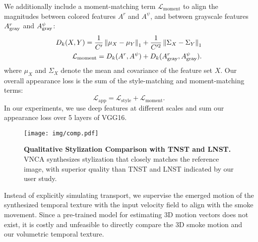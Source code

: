 We additionally include a moment-matching term $\mathcal{L}_\text{moment}$ to align the magnitudes between colored features $A^r$ and $A^\psi$, and between grayscale features $A_{\textup{gray}}^r$ and $A_{\textup{gray}}^\psi$:
\begin{equation}
    \begin{aligned}
        D_k(X, Y) = \frac{1}{C'} \left\lVert\mu_{X} - \mu_{Y}\right\rVert_1 +  \frac{1}{C'^2} \left\lVert\Sigma_{X} - \Sigma_{Y}\right\rVert_1 \\
        \mathcal{L}_\text{moment} = D_k(A^r, A^\psi) + D_k({A}_{\textup{gray}}^r, {A}_{\textup{gray}}^\psi). 
    \end{aligned}
\end{equation}
where $\mu_{X}$ and $\Sigma_{X}$ denote the mean and covariance of the feature set $X$. 
Our overall appearance loss is the sum of the style-matching and moment-matching terms:
\begin{equation}
     \mathcal{L}_\text{app} = \mathcal{L}_\text{style} + \mathcal{L}_\text{moment}.
\end{equation}
In our experiments, we use deep features at different scales and sum our appearance loss over 5 layers of VGG16.

\begin{figure}
  \centering
  \texttt{[image: img/comp.pdf]}
  \caption{\textbf{Qualitative Stylization Comparison with TNST and LNST.} VNCA synthesizes stylization that closely matches the reference image, with superior quality than TNST and LNST indicated by our user study.}
  \label{fig:comp}
\end{figure}



\medskip
{}
\label{sec:motion}
Instead of explicitly simulating transport, we supervise the emerged motion of the synthesized temporal texture with the input velocity field to align with the smoke movement.
Since a pre-trained model for estimating 3D motion vectors does not exist, it is costly and unfeasible to directly compare the 3D smoke motion and our volumetric temporal texture. 

